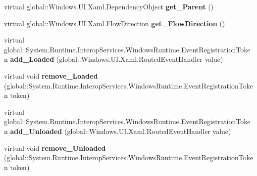 \begin{DoxyCompactItemize}
\item 
\mbox{\label{class_windows_1_1_u_i_1_1_xaml_1_1_framework_element_a7efd68b56519cedcc2cedefdcf122ff7}} 
virtual global\+::\+Windows.\+U\+I.\+Xaml.\+Dependency\+Object {\bfseries get\+\_\+\+Parent} ()
\item 
\mbox{\label{class_windows_1_1_u_i_1_1_xaml_1_1_framework_element_ac5ff3ae585984d3cd556a50d71f62b36}} 
virtual global\+::\+Windows.\+U\+I.\+Xaml.\+Flow\+Direction {\bfseries get\+\_\+\+Flow\+Direction} ()
\item 
\mbox{\label{class_windows_1_1_u_i_1_1_xaml_1_1_framework_element_afcc0c9f29c9a0911255d8104c61f97d4}} 
virtual global\+::\+System.\+Runtime.\+Interop\+Services.\+Windows\+Runtime.\+Event\+Registration\+Token {\bfseries add\+\_\+\+Loaded} (global\+::\+Windows.\+U\+I.\+Xaml.\+Routed\+Event\+Handler value)
\item 
\mbox{\label{class_windows_1_1_u_i_1_1_xaml_1_1_framework_element_ae8bbc1aa6042890029fe272abd141c94}} 
virtual void {\bfseries remove\+\_\+\+Loaded} (global\+::\+System.\+Runtime.\+Interop\+Services.\+Windows\+Runtime.\+Event\+Registration\+Token token)
\item 
\mbox{\label{class_windows_1_1_u_i_1_1_xaml_1_1_framework_element_ac438721510bd4b3625cc0d47f3c3afc7}} 
virtual global\+::\+System.\+Runtime.\+Interop\+Services.\+Windows\+Runtime.\+Event\+Registration\+Token {\bfseries add\+\_\+\+Unloaded} (global\+::\+Windows.\+U\+I.\+Xaml.\+Routed\+Event\+Handler value)
\item 
\mbox{\label{class_windows_1_1_u_i_1_1_xaml_1_1_framework_element_a411df0e96e83d467a1e657159f3e681a}} 
virtual void {\bfseries remove\+\_\+\+Unloaded} (global\+::\+System.\+Runtime.\+Interop\+Services.\+Windows\+Runtime.\+Event\+Registration\+Token token)
\item 
\mbox{\label{class_windows_1_1_u_i_1_1_xaml_1_1_framework_element_aca30f924068a6a4384853203e07dcb3d}} 

\end{DoxyCompactItemize}
